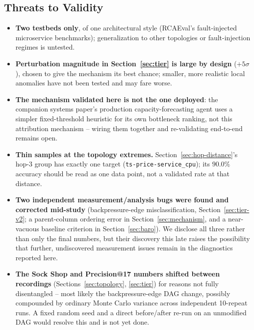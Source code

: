 \documentclass[journal, 10pt]{IEEEtran}
\begin{document}
\subsection{Threats to Validity}
\begin{itemize}
    \item \textbf{Two testbeds only}, of one architectural style (RCAEval's fault-injected microservice benchmarks); generalization to other topologies or fault-injection regimes is untested.
    \item \textbf{Perturbation magnitude in Section~\ref{sec:tier} is large by design} ($+5\sigma$), chosen to give the mechanism its best chance; smaller, more realistic local anomalies have not been tested and may fare worse.
    \item \textbf{The mechanism validated here is not the one deployed}: the companion systems paper's production capacity-forecasting agent uses a simpler fixed-threshold heuristic for its own bottleneck ranking, not this attribution mechanism -- wiring them together and re-validating end-to-end remains open.
    \item \textbf{Thin samples at the topology extremes.} Section~\ref{sec:hop-distance}'s hop-3 group has exactly one target (\texttt{ts-price-service\_cpu}); its $90.0\%$ accuracy should be read as one data point, not a validated rate at that distance.
    \item \textbf{Two independent measurement/analysis bugs were found and corrected mid-study} (backpressure-edge misclassification, Section~\ref{sec:tier-v2}; a parent-column ordering error in Section~\ref{sec:mechanism}, and a near-vacuous baseline criterion in Section~\ref{sec:baro}). We disclose all three rather than only the final numbers, but their discovery this late raises the possibility that further, undiscovered measurement issues remain in the diagnostics reported here.
    \item \textbf{The Sock Shop and Precision@17 numbers shifted between recordings} (Sections~\ref{sec:topology}, \ref{sec:tier}) for reasons not fully disentangled -- most likely the backpressure-edge DAG change, possibly compounded by ordinary Monte Carlo variance across independent 10-repeat runs. A fixed random seed and a direct before/after re-run on an unmodified DAG would resolve this and is not yet done.
\end{itemize}

\end{document}
